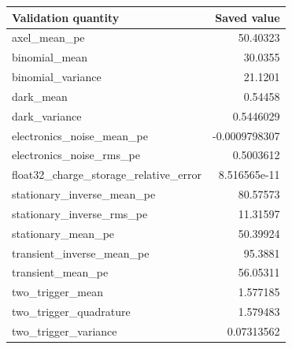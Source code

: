 \begin{center}\small
\begin{tabular}{lr}\toprule Validation quantity & Saved value \\\midrule
axel\_mean\_pe & 50.40323 \\
binomial\_mean & 30.0355 \\
binomial\_variance & 21.1201 \\
dark\_mean & 0.54458 \\
dark\_variance & 0.5446029 \\
electronics\_noise\_mean\_pe & -0.0009798307 \\
electronics\_noise\_rms\_pe & 0.5003612 \\
float32\_charge\_storage\_relative\_error & 8.516565e-11 \\
stationary\_inverse\_mean\_pe & 80.57573 \\
stationary\_inverse\_rms\_pe & 11.31597 \\
stationary\_mean\_pe & 50.39924 \\
transient\_inverse\_mean\_pe & 95.3881 \\
transient\_mean\_pe & 56.05311 \\
two\_trigger\_mean & 1.577185 \\
two\_trigger\_quadrature & 1.579483 \\
two\_trigger\_variance & 0.07313562 \\
\bottomrule\end{tabular}
\end{center}
